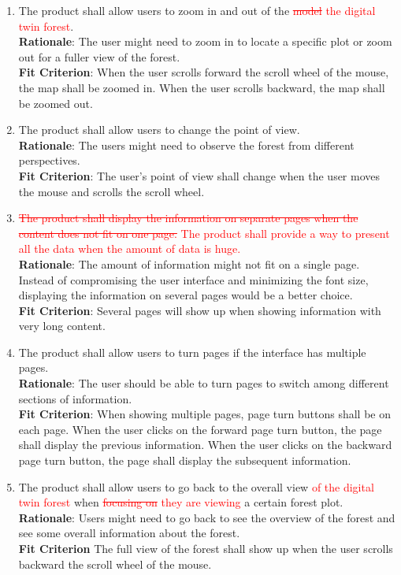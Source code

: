 \documentclass{article}
\begin{document}
\begin{enumerate}[FR1]
	\item The product shall allow users to zoom in and out of the \textcolor{red}{\st{model} the 
	digital twin forest}.\\
	\textbf{Rationale}: The user might need to zoom in to locate a specific plot or zoom out for a fuller view of the forest. \\
	\textbf{Fit Criterion}: When the user scrolls forward the scroll wheel of the mouse, the map shall be zoomed in. When the user scrolls backward, the map shall be zoomed out. 
	
	\item The product shall allow users to change the point of view. \\
	\textbf{Rationale}: The users might need to observe the forest from different perspectives.\\
	\textbf{Fit Criterion}: The user's point of view shall change when the user moves the mouse and scrolls the scroll wheel.
	
	\item \textcolor{red}{\st{The product shall display the information on separate pages when the
	 content does not fit on one page.} The product shall provide a way to present all the data when
	  the amount of data is huge.}\\
	\textbf{Rationale}: The amount of information might not fit on a single page. Instead of
	 compromising the user interface and minimizing the font size, displaying the information on
	  several pages would be a better choice.\\
	\textbf{Fit Criterion}: Several pages will show up when showing information with very long content.
	
	\item The product shall allow users to turn pages if the interface has multiple pages. \\
	\textbf{Rationale}: The user should be able to turn pages to switch among different sections of information.\\
	\textbf{Fit Criterion}: When showing multiple pages, page turn buttons shall be on each page. When the user clicks on the forward page turn button, the page shall display the previous information. When the user clicks on the backward page turn button, the page shall display the subsequent information.
	
	\item The product shall allow users to go back to the overall view \textcolor{red}{of the digital
	twin forest} when \textcolor{red}{\st{focusing on} they are viewing} a certain forest plot.\\
	\textbf{Rationale}: Users might need to go back to see the overview of the forest and see some
	 overall information about the forest.  \\
	\textbf{Fit Criterion} The full view of the forest shall show up when the user scrolls backward the
	 scroll wheel of the mouse.
	

\end{enumerate}
\end{document}
